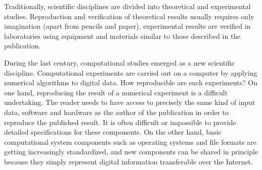 Traditionally, scientific disciplines are divided into theoretical and
experimental studies. Reproduction and verification of theoretical
results usually requires only imagination (apart from pencils and
paper), experimental results are verified in laboratories using
equipment and materials similar to those described in the publication.

During the last century, computational studies emerged as a new
scientific discipline. Computational experiments are carried out on a
computer by applying numerical algorithms to digital data. How
reproducible are such experiments? On one hand, reproducing the result
of a numerical experiment is a difficult undertaking. The reader needs
to have access to precisely the same kind of input data, software and
hardware as the author of the publication in order to reproduce the
published result. It is often difficult or impossible to provide
detailed specifications for these components. On the other hand, basic
computational system components such as operating systems and
file formats are getting increasingly standardized, and new components
can be shared in principle because they simply represent digital
information transferable over the Internet.

